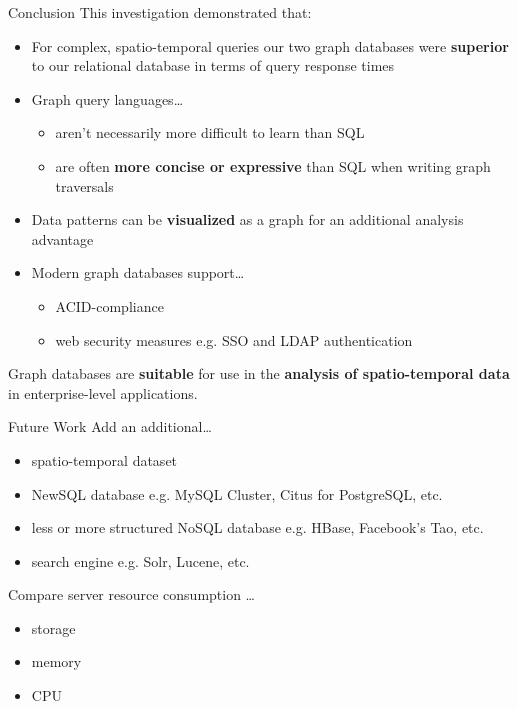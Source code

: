 \begin{frame}{Conclusion}
    This investigation demonstrated that:
    \vfill
    \begin{itemize}
        \item For complex, spatio-temporal queries our two graph databases were \textbf{superior} to our relational database in terms of query response times
        \item Graph query languages\dots
        \begin{itemize}
            \item aren't necessarily more difficult to learn than SQL
            \item are often \textbf{more concise or expressive} than SQL when writing graph traversals
        \end{itemize}
        \item Data patterns can be \textbf{visualized} as a graph for an additional analysis advantage
        \item Modern graph databases support\dots
        \begin{itemize}
            \item ACID-compliance
            \item web security measures e.g. SSO and LDAP authentication
        \end{itemize}
    \end{itemize}
    \vfill
    Graph databases are \textbf{suitable} for use in the \textbf{analysis of spatio-temporal data} in enterprise-level applications.
\end{frame}

\begin{frame}{Future Work}
    Add an additional\dots
    \begin{itemize}
        \item spatio-temporal dataset
        \item NewSQL database e.g. MySQL Cluster, Citus for PostgreSQL, etc.
        \item less or more structured NoSQL database e.g. HBase, Facebook's Tao, etc.
        \item search engine e.g. Solr, Lucene, etc.
    \end{itemize}
    \vfill
    Compare server resource consumption \dots
    \begin{itemize}
        \item storage
        \item memory
        \item CPU
    \end{itemize}
\end{frame}

